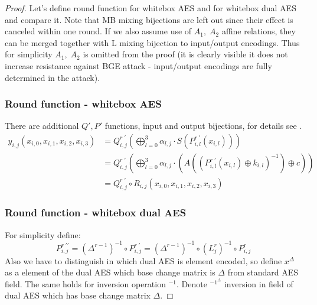 \documentclass[11pt,oneside,final]{fithesis2}
\begin{document}
	\begin{proof}
	Let's define round function for whitebox AES and for whitebox dual AES and compare it. 
	Note that MB mixing bijections are left out since their effect is canceled within one round. If we also assume use of $A_1, \; A_2$ affine relations,
	they can be merged together with L mixing bijection to input/output encodings. Thus for simplicity $A_1, \; A_2$ is omitted from the proof (it is clearly visible 
	it does not increase resistance against BGE attack - input/output encodings are fully determined in the attack).

	\subsubsection*{Round function - whitebox AES}
	There are additional $Q' ,P' $ functions, input and output bijections, for details see \citep{Chow02white-boxcryptography} \citep{Billet:2004:CWB:2080787.2080809}.
	\begin{subequations}
	\begin{align} 
	y_{i,j}\left(x_{i,0}, x_{i,1}, x_{i,2}, x_{i,3}\right)  &= Q^{r \; \prime}_{i,j}\left( \bigoplus^3_{l=0} \alpha_{l,j} \cdot S \left(P^{r \; \prime}_{i,l}\left(x_{i,l}\right) \right) \right) \\
								&= Q^{r \; \prime}_{i,j}\left( \bigoplus^3_{l=0} \alpha_{l,j} \cdot \left( A \left( \left(P^{r \; \prime}_{i,l}\left(x_{i,l}\right) \oplus k_{i,l} \right)^{-1} \right) \oplus c \right) \right) \\
								&= Q^{r \; \prime}_{i,j} \circ R_{i,j}\left(x_{i,0}, x_{i,1}, x_{i,2}, x_{i,3}\right) \label{eq:whitebox_aes_roud}
	\end{align}
	\end{subequations}

	\subsubsection*{Round function - whitebox dual AES}
	For simplicity define:
	\begin{equation}
	    P^{r \; \prime\prime}_{i,j} = \left(\Delta^{r-1}\right)^{-1} \circ P^{r \; \prime}_{i,j} = \left(\Delta^{r-1}\right)^{-1} \circ (L^{r}_{j})^{-1} \circ P^{r}_{i,j} \label{eq:ioencoding_abstract_p}
	\end{equation}
	Also we have to distinguish in which dual AES is element encoded, so define $x^{\Delta}$ as a element of the dual AES which base change matrix is $\Delta$ from standard AES field. 
	The same holds for inversion operation $^{-1}$. Denote $^{-1^{\Delta}}$ inversion in field of dual AES which has base change matrix $\Delta$.
	

\end{proof}
\end{document}
